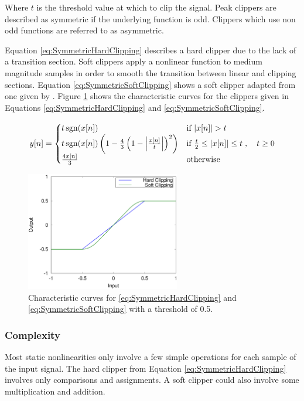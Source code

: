		Where $t$ is the threshold value at which to clip the signal. Peak clippers are described as symmetric if
		the underlying function is odd. Clippers which use non odd functions are referred to as asymmetric.

		Equation \ref{eq:SymmetricHardClipping} describes a hard clipper due to the lack of a transition section.
		Soft clippers apply a nonlinear function to medium magnitude samples in order to smooth the transition
		between linear and clipping sections. Equation \ref{eq:SymmetricSoftClipping} shows a soft clipper adapted
		from one given by \citet{dutilleux2011nonlinear}. Figure \ref{fig:Clipping} shows the characteristic curves
		for the clippers given in Equations \ref{eq:SymmetricHardClipping} and \ref{eq:SymmetricSoftClipping}.

		\begin{equation}
			y[n] = \begin{cases}
				t\operatorname{sgn}(x[n]) & \text{if $|x[n]| > t$} \\
				t\operatorname{sgn}(x[n]) \left( 1 - \frac{4}{3} \left( 1 - \left| \frac{x[n]}{t} \right| \right)^{2}
					\right) & \text{if $\frac{t}{2} \leq |x[n]| \leq t$} \\
				\frac{4x[n]}{3} & \text{otherwise}
			\end{cases}, \quad t \geq 0
			\label{eq:SymmetricSoftClipping}
		\end{equation}

		\begin{figure}[h!]
			\centering
			\includegraphics[width=0.6\textwidth]{chapter3/Images/Clipping.eps}
			\caption{Characteristic curves for \ref{eq:SymmetricHardClipping} and
				 \ref{eq:SymmetricSoftClipping} with a threshold of 0.5.}
			\label{fig:Clipping}
		\end{figure}

		\subsubsection*{Complexity}
			Most static nonlinearities only involve a few simple operations for each sample of the input
			signal. The hard clipper from Equation \ref{eq:SymmetricHardClipping} involves only comparisons and
			assignments. A soft clipper could also involve some multiplication and addition.
			
